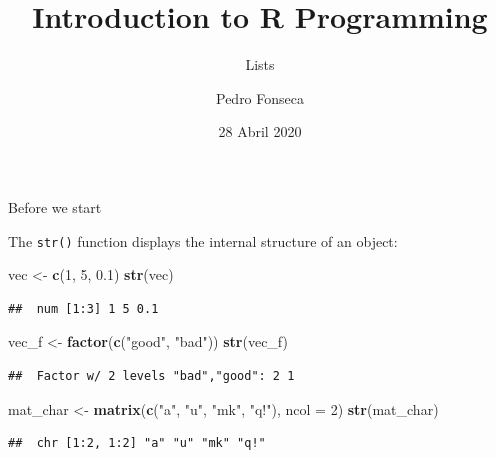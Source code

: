 \documentclass[ignorenonframetext,]{beamer}
\title{Introduction to R Programming}
\subtitle{Lists}
\author{Pedro Fonseca}
\date{28 Abril 2020}
\newenvironment{Shaded}{\begin{snugshade}}{\end{snugshade}}
\newcommand{\DataTypeTok}[1]{\textcolor[rgb]{0.13,0.29,0.53}{#1}}
\newcommand{\DecValTok}[1]{\textcolor[rgb]{0.00,0.00,0.81}{#1}}
\newcommand{\FloatTok}[1]{\textcolor[rgb]{0.00,0.00,0.81}{#1}}
\newcommand{\KeywordTok}[1]{\textcolor[rgb]{0.13,0.29,0.53}{\textbf{#1}}}
\newcommand{\NormalTok}[1]{#1}
\newcommand{\StringTok}[1]{\textcolor[rgb]{0.31,0.60,0.02}{#1}}
\begin{document}
\frame{\titlepage}

\begin{frame}[fragile]{Before we start}
\protect\hypertarget{before-we-start}{}

The \texttt{str()} function displays the internal structure of an
object:

\begin{Shaded}
\begin{Highlighting}[]
\NormalTok{vec <-}\StringTok{ }\KeywordTok{c}\NormalTok{(}\DecValTok{1}\NormalTok{, }\DecValTok{5}\NormalTok{, }\FloatTok{0.1}\NormalTok{)}
\KeywordTok{str}\NormalTok{(vec)}
\end{Highlighting}
\end{Shaded}

\begin{verbatim}
##  num [1:3] 1 5 0.1
\end{verbatim}

\begin{Shaded}
\begin{Highlighting}[]
\NormalTok{vec_f <-}\StringTok{ }\KeywordTok{factor}\NormalTok{(}\KeywordTok{c}\NormalTok{(}\StringTok{"good"}\NormalTok{, }\StringTok{"bad"}\NormalTok{))}
\KeywordTok{str}\NormalTok{(vec_f)}
\end{Highlighting}
\end{Shaded}

\begin{verbatim}
##  Factor w/ 2 levels "bad","good": 2 1
\end{verbatim}

\begin{Shaded}
\begin{Highlighting}[]
\NormalTok{mat_char <-}\StringTok{ }\KeywordTok{matrix}\NormalTok{(}\KeywordTok{c}\NormalTok{(}\StringTok{"a"}\NormalTok{, }\StringTok{"u"}\NormalTok{, }\StringTok{"mk"}\NormalTok{, }\StringTok{"q!"}\NormalTok{), }\DataTypeTok{ncol =} \DecValTok{2}\NormalTok{)}
\KeywordTok{str}\NormalTok{(mat_char)}
\end{Highlighting}
\end{Shaded}

\begin{verbatim}
##  chr [1:2, 1:2] "a" "u" "mk" "q!"
\end{verbatim}

\end{frame}
\end{document}
